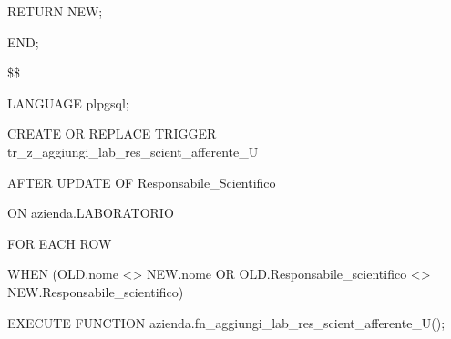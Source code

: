 \begin{flushleft}
\begin{description}
\begin{description}
                        \item RETURN NEW;
                    \end{description}
                    \item END;
                    \item \$\$
                    \item LANGUAGE plpgsql;
                \end{description}
            \end{flushleft}
        \normalfont

        \ttfamily
            \begin{flushleft}
                \begin{description}
                    \item CREATE OR REPLACE TRIGGER tr\_z\_aggiungi\_lab\_res\_scient\_afferente\_U
                    \item AFTER UPDATE OF Responsabile\_Scientifico
                    \item ON azienda.LABORATORIO
                    \item FOR EACH ROW
                    \item WHEN (OLD.nome <> NEW.nome OR OLD.Responsabile\_scientifico <> NEW.Responsabile\_scientifico)
                    \item EXECUTE FUNCTION azienda.fn\_aggiungi\_lab\_res\_scient\_afferente\_U();
                \end{description}
            \end{flushleft}
        \normalfont

\newpage

